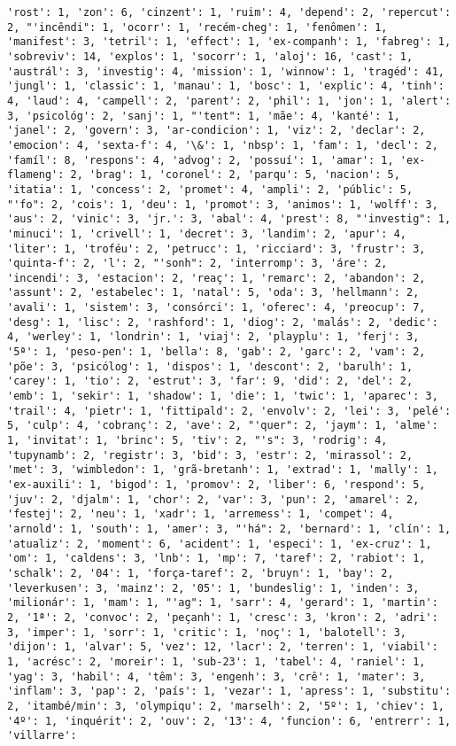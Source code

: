 \documentclass[11pt]{article}
\begin{document}
\begin{Verbatim}[commandchars=\\\{\}]
'rost': 1, 'zon': 6, 'cinzent': 1, 'ruim': 4, 'depend': 2, 'repercut': 2, "'incêndi": 1, 'ocorr': 1, 'recém-cheg': 1, 'fenômen': 1, 'manifest': 3, 'tetril': 1, 'effect': 1, 'ex-companh': 1, 'fabreg': 1, 'sobreviv': 14, 'explos': 1, 'socorr': 1, 'aloj': 16, 'cast': 1, 'austrál': 3, 'investig': 4, 'mission': 1, 'winnow': 1, 'tragéd': 41, 'jungl': 1, 'classic': 1, 'manau': 1, 'bosc': 1, 'explic': 4, 'tinh': 4, 'laud': 4, 'campell': 2, 'parent': 2, 'phil': 1, 'jon': 1, 'alert': 3, 'psicológ': 2, 'sanj': 1, "'tent": 1, 'mãe': 4, 'kanté': 1, 'janel': 2, 'govern': 3, 'ar-condicion': 1, 'viz': 2, 'declar': 2, 'emocion': 4, 'sexta-f': 4, '\&': 1, 'nbsp': 1, 'fam': 1, 'decl': 2, 'famíl': 8, 'respons': 4, 'advog': 2, 'possuí': 1, 'amar': 1, 'ex-flameng': 2, 'brag': 1, 'coronel': 2, 'parqu': 5, 'nacion': 5, 'itatia': 1, 'concess': 2, 'promet': 4, 'ampli': 2, 'públic': 5, "'fo": 2, 'cois': 1, 'deu': 1, 'promot': 3, 'animos': 1, 'wolff': 3, 'aus': 2, 'vinic': 3, 'jr.': 3, 'abal': 4, 'prest': 8, "'investig": 1, 'minuci': 1, 'crivell': 1, 'decret': 3, 'landim': 2, 'apur': 4, 'liter': 1, 'troféu': 2, 'petrucc': 1, 'ricciard': 3, 'frustr': 3, 'quinta-f': 2, 'l': 2, "'sonh": 2, 'interromp': 3, 'áre': 2, 'incendi': 3, 'estacion': 2, 'reaç': 1, 'remarc': 2, 'abandon': 2, 'assunt': 2, 'estabelec': 1, 'natal': 5, 'oda': 3, 'hellmann': 2, 'avali': 1, 'sistem': 3, 'consórci': 1, 'oferec': 4, 'preocup': 7, 'desg': 1, 'lisc': 2, 'rashford': 1, 'diog': 2, 'malás': 2, 'dedic': 4, 'werley': 1, 'londrin': 1, 'viaj': 2, 'playplu': 1, 'ferj': 3, '5ª': 1, 'peso-pen': 1, 'bella': 8, 'gab': 2, 'garc': 2, 'vam': 2, 'põe': 3, 'psicólog': 1, 'dispos': 1, 'descont': 2, 'barulh': 1, 'carey': 1, 'tio': 2, 'estrut': 3, 'far': 9, 'did': 2, 'del': 2, 'emb': 1, 'sekir': 1, 'shadow': 1, 'die': 1, 'twic': 1, 'aparec': 3, 'trail': 4, 'pietr': 1, 'fittipald': 2, 'envolv': 2, 'lei': 3, 'pelé': 5, 'culp': 4, 'cobranç': 2, 'ave': 2, "'quer": 2, 'jaym': 1, 'alme': 1, 'invitat': 1, 'brinc': 5, 'tiv': 2, "'s": 3, 'rodrig': 4, 'tupynamb': 2, 'registr': 3, 'bid': 3, 'estr': 2, 'mirassol': 2, 'met': 3, 'wimbledon': 1, 'grã-bretanh': 1, 'extrad': 1, 'mally': 1, 'ex-auxili': 1, 'bigod': 1, 'promov': 2, 'liber': 6, 'respond': 5, 'juv': 2, 'djalm': 1, 'chor': 2, 'var': 3, 'pun': 2, 'amarel': 2, 'festej': 2, 'neu': 1, 'xadr': 1, 'arremess': 1, 'compet': 4, 'arnold': 1, 'south': 1, 'amer': 3, "'há": 2, 'bernard': 1, 'clín': 1, 'atualiz': 2, 'moment': 6, 'acident': 1, 'especi': 1, 'ex-cruz': 1, 'om': 1, 'caldens': 3, 'lnb': 1, 'mp': 7, 'taref': 2, 'rabiot': 1, 'schalk': 2, '04': 1, 'força-taref': 2, 'bruyn': 1, 'bay': 2, 'leverkusen': 3, 'mainz': 2, '05': 1, 'bundeslig': 1, 'inden': 3, 'milionár': 1, 'mam': 1, "'ag": 1, 'sarr': 4, 'gerard': 1, 'martin': 2, '1ª': 2, 'convoc': 2, 'peçanh': 1, 'cresc': 3, 'kron': 2, 'adri': 3, 'imper': 1, 'sorr': 1, 'critic': 1, 'noç': 1, 'balotell': 3, 'dijon': 1, 'alvar': 5, 'vez': 12, 'lacr': 2, 'terren': 1, 'viabil': 1, 'acrésc': 2, 'moreir': 1, 'sub-23': 1, 'tabel': 4, 'raniel': 1, 'yag': 3, 'habil': 4, 'têm': 3, 'engenh': 3, 'crê': 1, 'mater': 3, 'inflam': 3, 'pap': 2, 'país': 1, 'vezar': 1, 'apress': 1, 'substitu': 2, 'itambé/min': 3, 'olympiqu': 2, 'marselh': 2, '5º': 1, 'chiev': 1, '4º': 1, 'inquérit': 2, 'ouv': 2, '13': 4, 'funcion': 6, 'entrerr': 1, 'villarre': 
\end{Verbatim}
\end{document}
